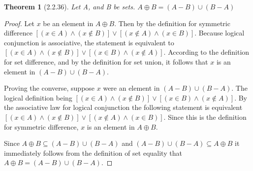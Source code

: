 \documentclass[a4paper, 12pt]{article}
\theoremstyle{plain}
\newtheorem*{theorem*}{Theorem}
\begin{document}
	
	\begin{theorem*}[2.2.36]
		Let A, and B be sets. $A \oplus B = (A - B) \cup (B - A)$
	\end{theorem*}
	
	\begin{proof}
		Let $x$ be an element in $A \oplus B$. Then by the definition for symmetric \newline difference $[(x \in A) \land (x \notin B)] \lor [(x \notin A) \land (x \in B)]$. Because logical \newline conjunction is associative, the statement is equivalent to \newline $[(x \in A) \land (x \notin B)] \lor [(x \in B) \land (x \notin A)]$. According to the definition for set difference, and by the definition for set union, it follows that $x$ is an element in $(A - B) \cup (B - A)$.
		
		Proving the converse, suppose $x$ were an element in $(A - B) \cup (B - A)$. The logical definition being $[(x \in A) \land (x \notin B)] \lor [(x \in B) \land (x \notin A)]$. By the associative law for logical conjunction the following statement is equivalent $[(x \in A) \land (x \notin B)] \lor [(x \notin A) \land (x \in B)]$. Since this is the definition for symmetric difference, $x$ is an element in $A \oplus B$.
		
		Since $A \oplus B \subseteq (A - B) \cup (B - A)$ and $(A - B) \cup (B - A) \subseteq A \oplus B$ it immediately follows from the definition of set equality that \newline $A \oplus B = (A - B) \cup (B - A)$.
	\end{proof}
\end{document}
